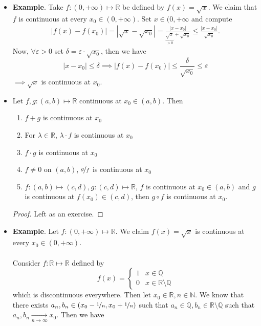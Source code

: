 \documentclass{article}
\newcommand{\Q}{\mathbb{Q}}
\newcommand{\R}{\mathbb{R}}
\newcommand{\N}{\mathbb{N}}
\newcommand{\?}{\stackrel{?}{=}}
\theoremstyle{definition} %
\begin{document}
\begin{itemize}
\begin{proof}
    \end{proof}
    \item \textbf{Example}. Take $f: (0, +\infty) \mapsto \R$ be defined by $f(x) = \sqrt{x}$. We claim that $f$ is continuous at every $x_0 \in (0, +\infty)$. Set $x \in (0, +\infty$ and compute
    \begin{align*}
        |f(x) - f(x_0)| = |\sqrt{x} - \sqrt{x_0}| = \frac{|x - x_0|}{\underbrace{\sqrt{x}}_{> 0} + \sqrt{x_0}} \leq \frac{|x - x_0|}{\sqrt{x_0}}.
    \end{align*}
    Now, $\forall \varepsilon > 0$ set $\delta = \varepsilon \cdot \sqrt{x_0}$, then we have
    $$|x - x_0| \leq \delta \implies |f(x) - f(x_0)| \leq \frac{\delta}{\sqrt{x_0}} \leq \varepsilon$$
    $\implies \sqrt{x}$ is continuous at $x_0$.
    \item[]
    \begin{proposition}
        Let $f, g: (a, b) \mapsto \R$ continuous at $x_0 \in (a, b)$. Then
        \begin{enumerate}[label=(\roman*)]
            \item $f + g$ is continuous at $x_0$
            \item For $\lambda \in \R$, $\lambda \cdot f$ is continuous at $x_0$
            \item $f \cdot g$ is continuous at $x_0$
            \item $f \neq 0$ on $(a, b)$, $\nicefrac{g}{f}$ is continuous at $x_0$
            \item $f: (a, b) \mapsto (c, d), g: (c, d) \mapsto \R$, $f$ is continuous at $x_0 \in (a, b)$ and $g$ is continuous at $f(x_0) \in (c, d)$, then $g \circ f$ is continuous at $x_0$.
        \end{enumerate}
    \end{proposition}
    \begin{proof}
        Left as an exercise.
    \end{proof}
    \item \textbf{Example}. Let $f: (0, +\infty) \mapsto \R$. We claim $f(x) = \sqrt{x}$ is continuous at every $x_0 \in (0, +\infty)$. \\\\
    Consider $f: \R \mapsto \R$ defined by
    \[
    f(x) =
    \begin{cases}
        1 & x \in \Q \\
        0 & x \in \R \setminus \Q
    \end{cases}
    \]
    which is discontinuous everywhere. Then let $x_0 \in \R, n \in \N$. We know that there exists $a_n, b_n \in (x_0 - \nicefrac{1}{n}, x_0 + \nicefrac{1}{n})$ such that $a_n \in \Q, b_n \in \R \setminus \Q$ such that $a_n, b_n \underset{n \rightarrow \infty}{\longrightarrow} x_0$. Then we have

\end{itemize}
\end{document}
